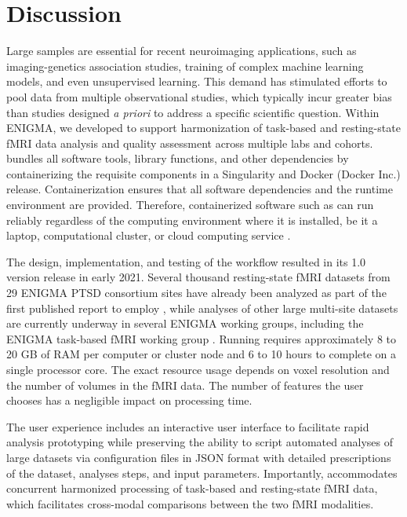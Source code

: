 \section{Discussion}

Large samples are essential for recent neuroimaging applications, such as
imaging-genetics association studies, training of complex machine learning
models, and even unsupervised learning. This demand has stimulated efforts
to pool data from multiple observational studies, which typically incur
greater bias than studies designed \emph{a priori} to address a specific
scientific question. Within ENIGMA, we developed  to support
harmonization of task-based and resting-state fMRI data analysis and
quality assessment across multiple labs and cohorts. 
bundles all software tools, library functions, and other dependencies by
containerizing the requisite components in a Singularity
\parencite{kurtzer2017} and Docker (Docker Inc.) release.
Containerization ensures that all software dependencies and the runtime
environment are provided. Therefore, containerized software such as
 can run reliably regardless of the computing environment
where it is installed, be it a laptop, computational cluster, or cloud
computing service \parencite{gruning2018}.

The design, implementation, and testing of the  workflow
resulted in its 1.0 version release in early 2021. Several thousand
resting-state fMRI datasets from 29 ENIGMA PTSD consortium sites have
already been analyzed as part of the first published report to employ
 \parencite{weis2020b}, while analyses of other large
multi-site datasets are currently underway in several ENIGMA working
groups, including the ENIGMA task-based fMRI working group \parencite{veer2019b}. 
Running  requires approximately 8 to 20 GB of RAM per
computer or cluster node and 6 to 10 hours to complete on a single
processor core. The exact resource usage depends on voxel resolution and
the number of volumes in the fMRI data. The number of features the user
chooses has a negligible impact on processing time.

The  user experience includes an interactive user interface
to facilitate rapid analysis prototyping while preserving the ability to
script automated analyses of large datasets via configuration files in JSON
format with detailed prescriptions of the dataset, analyses steps, and
input parameters. Importantly,  accommodates concurrent
harmonized processing of task-based and resting-state fMRI data, which
facilitates cross-modal comparisons between the two fMRI modalities.

